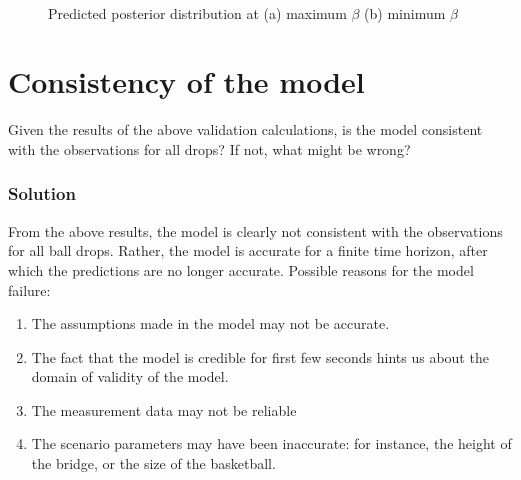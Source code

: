 \documentclass{article}
\begin{document}
\begin{figure}[H]
\begin{centering}
\,\,\,
\par\end{centering}
\caption{Predicted posterior distribution at (a) maximum $\beta$ (b) minimum
$\beta$}

\label{balldrop1t5-3-3}
\end{figure}



\section{Consistency of the model}

Given the results of the above validation calculations, is the model
consistent with the observations for all drops? If not, what might
be wrong?


\subsubsection*{Solution}

From the above results, the model is clearly not consistent with the
observations for all ball drops. Rather, the model is accurate for
a finite time horizon, after which the predictions are no longer accurate.
Possible reasons for the model failure:
\begin{enumerate}
\item The assumptions made in the model may not be accurate.
\item The fact that the model is credible for first few seconds hints us
about the domain of validity of the model.
\item The measurement data may not be reliable
\item The scenario parameters may have been inaccurate: for instance,
      the height of the bridge, or the size of the basketball.
\end{enumerate}
\end{document}
